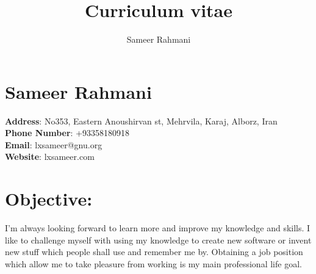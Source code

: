 \documentclass[a4paper,11pt]{article}
\author{Sameer Rahmani}
\title{Curriculum vitae}
\begin{document}
\maketitle
\newpage
\section*{Sameer Rahmani}
\textbf{Address}: No353, Eastern Anoushirvan st, Mehrvila, Karaj, Alborz, Iran\\
\textbf{Phone Number}: +93358180918\\
\textbf{Email}: lxsameer@gnu.org\\
\textbf{Website}: lxsameer.com\\

\section*{Objective:}
I'm always looking forward to learn more and improve my knowledge and skills.
I like to challenge myself with using my knowledge to create new software or
invent new stuff which people shall use and remember me by. Obtaining a job
position which allow me to take pleasure from working is my main professional
life goal.
\end{document}
